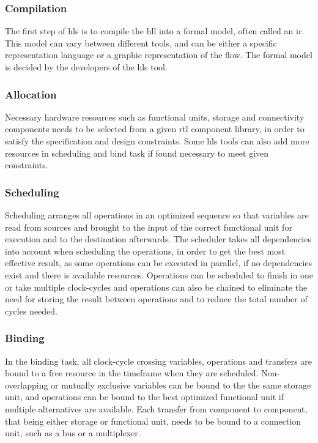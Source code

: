 \subsubsection{Compilation}

The first step of \gls{hls} is to compile the \gls{hll} into a formal model, often called an \gls{ir}. This model can vary between different tools, and can be either a specific representation language or a graphic representation of the flow. The formal model is decided by the developers of the \gls{hls} tool. 

\subsubsection{Allocation}

Necessary hardware resources such as functional units, storage and connectivity components needs to be selected from a given \gls{rtl} component library, in order to satisfy the specification and design constraints. Some \gls{hls} tools can also add more resources in scheduling and bind task if found necessary to meet given constraints.

\subsubsection{Scheduling}
Scheduling arranges all operations in an optimized sequence so that variables are read from sources and brought to the input of the correct functional unit for execution and to the destination afterwards. The scheduler takes all dependencies into account when scheduling the operations, in order to get the best most effective result, as some operations can be executed in parallel, if no dependencies exist and there is available resources. Operations can be scheduled to finish in one or take multiple clock-cycles and operations can also be chained to eliminate the need for storing the result between operations and to reduce the total number of cycles needed. 

\subsubsection{Binding}

In the binding task, all clock-cycle crossing variables, operations and transfers are bound to a free resource in the timeframe when they are scheduled. Non-overlapping or mutually exclusive variables can be bound to the the same storage unit, and operations can be bound to the best optimized functional unit if multiple alternatives are available. Each transfer from component to component, that being either storage or functional unit, needs to be bound to a connection unit, such as a bus or a multiplexer.

